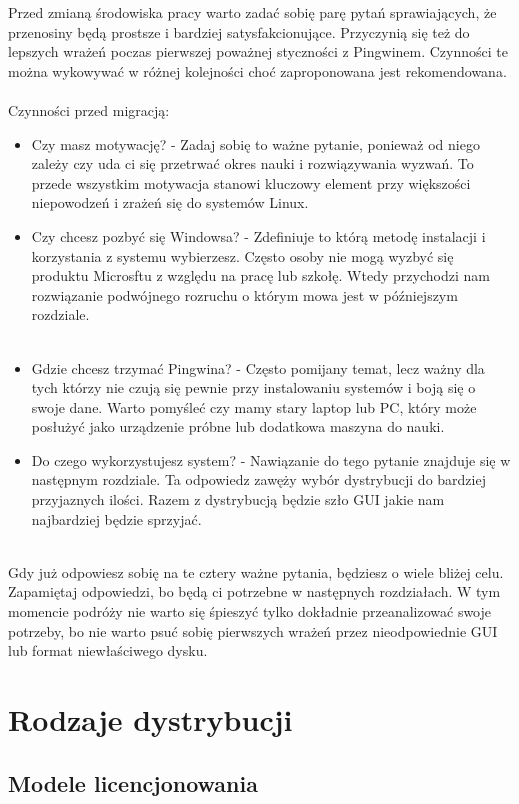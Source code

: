 \documentclass[10pt,a4paper]{report}
\begin{document}
Przed zmianą środowiska pracy warto zadać sobię parę pytań sprawiających, że przenosiny będą prostsze i bardziej satysfakcionujące. Przyczynią się też do lepszych wrażeń poczas pierwszej poważnej styczności z Pingwinem. Czynności te można wykowywać w różnej kolejności choć zaproponowana jest rekomendowana.\\\\
Czynności przed migracją:\\
\begin{itemize}
\item Czy masz motywację? - Zadaj sobię to ważne pytanie, ponieważ od niego zależy czy uda ci się przetrwać okres nauki i rozwiązywania wyzwań. To przede wszystkim motywacja stanowi kluczowy element przy większości niepowodzeń i zrażeń się do systemów Linux.
\item Czy chcesz pozbyć się Windowsa? - Zdefiniuje to którą metodę instalacji i korzystania z systemu wybierzesz. Często osoby nie mogą wyzbyć się produktu Microsftu z względu na pracę lub szkołę. Wtedy przychodzi nam rozwiązanie podwójnego rozruchu o którym mowa jest w późniejszym rozdziale.\\\\
\item Gdzie chcesz trzymać Pingwina? - Często pomijany temat, lecz ważny dla tych którzy nie czują się pewnie przy instalowaniu systemów i boją się o swoje dane. Warto pomyśleć czy mamy stary laptop lub PC, który może posłużyć jako urządzenie próbne lub dodatkowa maszyna do nauki.
\item Do czego wykorzystujesz system? - Nawiązanie do tego pytanie znajduje się w następnym rozdziale. Ta odpowiedz zawęży wybór dystrybucji do bardziej przyjaznych ilości. Razem z dystrybucją będzie szło GUI jakie nam najbardziej będzie sprzyjać. \\\\
\end{itemize}
Gdy już odpowiesz sobię na te cztery ważne pytania, będziesz o wiele bliżej celu. Zapamiętaj odpowiedzi, bo będą ci potrzebne w następnych rozdziałach. W tym momencie podróży nie warto się śpieszyć tylko dokładnie przeanalizować swoje potrzeby, bo nie warto psuć sobię pierwszych wrażeń przez nieodpowiednie GUI lub format niewłaściwego dysku.

\chapter{Rodzaje dystrybucji}

	\section{Modele licencjonowania}
	
\end{document}
